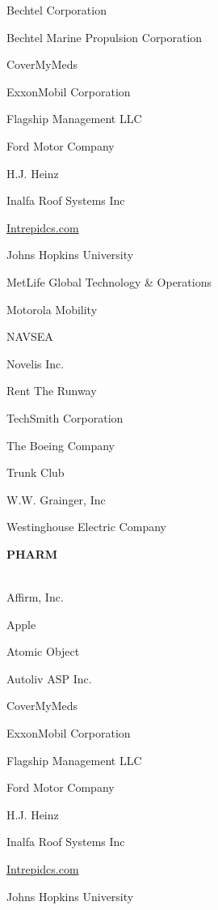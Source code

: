 \documentclass[twoside]{article}
\begin{document}
\begin{center}
\begin{multicols}{5}
\begin{FlushLeft}
\begin{compactitem}
\item Bechtel Corporation
\item Bechtel Marine Propulsion Corporation
\item CoverMyMeds
\item ExxonMobil Corporation
\item Flagship Management LLC
\item Ford Motor Company
\item H.J. Heinz
\item Inalfa Roof Systems Inc
\item \url{Intrepidcs.com}
\item Johns Hopkins University
\item MetLife Global Technology \& Operations
\item Motorola Mobility
\item NAVSEA
\item Novelis Inc.
\item Rent The Runway
\item TechSmith Corporation
\item The Boeing Company
\item Trunk Club
\item W.W. Grainger, Inc
\item Westinghouse Electric Company
\end{compactitem}
        \end{FlushLeft}
        \vspace{1em}
        {\fontsize{14}{16}\selectfont \bf PHARM}\\
        \vspace{-1em}
        ~\hrulefill~
        \vspace{-.9em}
        \begin{FlushLeft}
        \begin{compactitem}
        \item Affirm, Inc.
\item Apple
\item Atomic Object
\item Autoliv ASP Inc.
\item CoverMyMeds
\item ExxonMobil Corporation
\item Flagship Management LLC
\item Ford Motor Company
\item H.J. Heinz
\item Inalfa Roof Systems Inc
\item \url{Intrepidcs.com}
\item Johns Hopkins University

\end{compactitem}
\end{FlushLeft}
\end{multicols}
\end{center}
\end{document}
